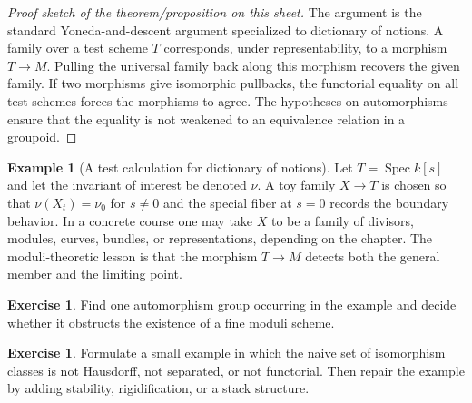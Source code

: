 \documentclass[11pt]{amsart}
\theoremstyle{definition}
\newtheorem{example}[theorem]{Example}
\newtheorem{exercise}[theorem]{Exercise}
\newcommand{\Spec}{\operatorname{Spec}}
\begin{document}
\begin{proof}[Proof sketch of the theorem/proposition on this sheet]
The argument is the standard Yoneda-and-descent argument specialized to dictionary of notions.  A family over a test scheme $T$ corresponds, under representability, to a morphism $T\to M$.  Pulling the universal family back along this morphism recovers the given family.  If two morphisms give isomorphic pullbacks, the functorial equality on all test schemes forces the morphisms to agree.  The hypotheses on automorphisms ensure that the equality is not weakened to an equivalence relation in a groupoid.
\end{proof}
\begin{example}[A test calculation for dictionary of notions]
Let $T=\Spec k[s]$ and let the invariant of interest be denoted $\nu$.  A toy family $X\to T$ is chosen so that $\nu(X_t)=\nu_0$ for $s\ne0$ and the special fiber at $s=0$ records the boundary behavior.  In a concrete course one may take $X$ to be a family of divisors, modules, curves, bundles, or representations, depending on the chapter.  The moduli-theoretic lesson is that the morphism $T\to M$ detects both the general member and the limiting point.
\end{example}
\begin{exercise}
Find one automorphism group occurring in the example and decide whether it obstructs the existence of a fine moduli scheme.
\end{exercise}
\begin{exercise}
Formulate a small example in which the naive set of isomorphism classes is not Hausdorff, not separated, or not functorial.  Then repair the example by adding stability, rigidification, or a stack structure.
\end{exercise}
\clearpage
\end{document}
